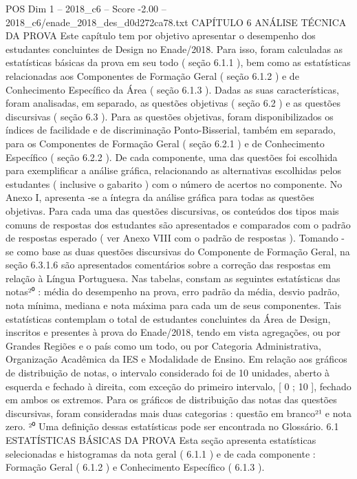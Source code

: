 \begin{textsample}{POS Dim 1 – 2018\_c6 – Score -2.00 – 2018\_c6/enade\_2018\_des\_d0d272ca78.txt}  \label{ex:f1_pos_245}
CAPÍTULO 6 ANÁLISE TÉCNICA DA PROVA Este capítulo tem por objetivo apresentar o desempenho dos estudantes concluintes de Design no Enade/2018.
Para isso, foram calculadas as estatísticas básicas da prova em seu todo ( seção 6.1.1 ), bem como as estatísticas relacionadas aos Componentes de Formação Geral ( seção 6.1.2 ) e de Conhecimento Específico da Área ( seção 6.1.3 ).
Dadas as suas características, foram analisadas, em separado, as questões objetivas ( seção 6.2 ) e as questões discursivas ( seção 6.3 ).
Para as questões objetivas, foram disponibilizados os índices de facilidade e de discriminação Ponto-Bisserial, também em separado, para os Componentes de Formação Geral ( seção 6.2.1 ) e de Conhecimento Específico ( seção 6.2.2 ).
De cada componente, uma das questões foi escolhida para exemplificar a análise gráfica, relacionando as alternativas escolhidas pelos estudantes ( inclusive o gabarito ) com o número de acertos no componente.
No Anexo I, apresenta -se a íntegra da análise gráfica para todas as questões objetivas.
Para cada uma das questões discursivas, os conteúdos dos tipos mais comuns de respostas dos estudantes são apresentados e comparados com o padrão de respostas esperado ( ver Anexo VIII com o padrão de respostas ).
Tomando -se como base as duas questões discursivas do Componente de Formação Geral, na seção 6.3.1.6 são apresentados comentários sobre a correção das respostas em relação à Língua Portuguesa.
Nas tabelas, constam as seguintes estatísticas das notas²⁰ : média do desempenho na prova, erro padrão da média, desvio padrão, nota mínima, mediana e nota máxima para cada um de seus componentes.
Tais estatísticas contemplam o total de estudantes concluintes da Área de Design, inscritos e presentes à prova do Enade/2018, tendo em vista agregações, ou por Grandes Regiões e o país como um todo, ou por Categoria Administrativa, Organização Acadêmica da IES e Modalidade de Ensino.
Em relação aos gráficos de distribuição de notas, o intervalo considerado foi de 10 unidades, aberto à esquerda e fechado à direita, com exceção do primeiro intervalo, [ 0 ; 10 ], fechado em ambos os extremos.
Para os gráficos de distribuição das notas das questões discursivas, foram consideradas mais duas categorias : questão em branco²¹ e nota zero. ²⁰ Uma definição dessas estatísticas pode ser encontrada no Glossário. 6.1 ESTATÍSTICAS BÁSICAS DA PROVA Esta seção apresenta estatísticas selecionadas e histogramas da nota geral ( 6.1.1 ) e de cada componente : Formação Geral ( 6.1.2 ) e Conhecimento Específico ( 6.1.3 ).

\end{textsample}
